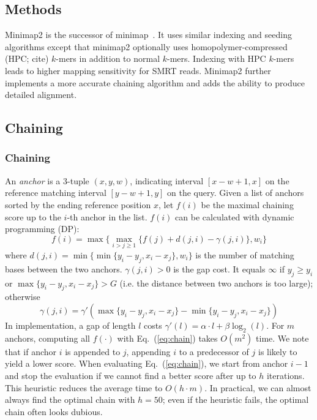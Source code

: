 \documentclass{bioinfo}
\begin{document}
\begin{methods}
\section{Methods}

Minimap2 is the successor of minimap~\citep{Li:2016aa}. It uses similar
indexing and seeding algorithms except that minimap2 optionally uses
homopolymer-compressed (HPC; cite) $k$-mers in addition to normal $k$-mers.
Indexing with HPC $k$-mers leads to higher mapping sensitivity for SMRT reads.
Minimap2 further implements a more accurate chaining algorithm and adds
the ability to produce detailed alignment.

\subsection{Chaining}

\subsubsection{Chaining}
An \emph{anchor} is a 3-tuple $(x,y,w)$, indicating interval $[x-w+1,x]$ on the
reference matching interval $[y-w+1,y]$ on the query. Given a list of anchors
sorted by the ending reference position $x$, let $f(i)$ be the maximal chaining
score up to the $i$-th anchor in the list. $f(i)$ can be calculated with
dynamic programming (DP):
\begin{equation}\label{eq:chain}
f(i)=\max\big\{\max_{i>j\ge 1} \{ f(j)+d(j,i)-\gamma(j,i) \},w_i\big\}
\end{equation}
where $d(j,i)=\min\big\{\min\{y_i-y_j,x_i-x_j\},w_i\big\}$ is the number of
matching bases between the two anchors. $\gamma(j,i)>0$ is the gap cost. It
equals $\infty$ if $y_j\ge y_i$ or $\max\{y_i-y_j,x_i-x_j\}>G$ (i.e. the
distance between two anchors is too large); otherwise
\[
\gamma(j,i)=\gamma'(\max\{y_i-y_j,x_i-x_j\}-\min\{y_i-y_j,x_i-x_j\})
\]
In implementation, a gap of length $l$ costs $\gamma'(l)=\alpha\cdot
l+\beta\log_2(l)$. For $m$ anchors, computing all $f(\cdot)$
with Eq.~(\ref{eq:chain}) takes $O(m^2)$ time. We note that if anchor $i$ is
appended to $j$, appending $i$ to a predecessor of $j$ is likely to yield a
lower score. When evaluating Eq.~(\ref{eq:chain}), we start from anchor $i-1$
and stop the evaluation if we cannot find a better score after up to $h$
iterations. This heuristic reduces the average time to $O(h\cdot m)$. In
practical, we can almost always find the optimal chain with $h=50$; even if the
heuristic fails, the optimal chain often looks dubious.


\end{methods}
\end{document}

